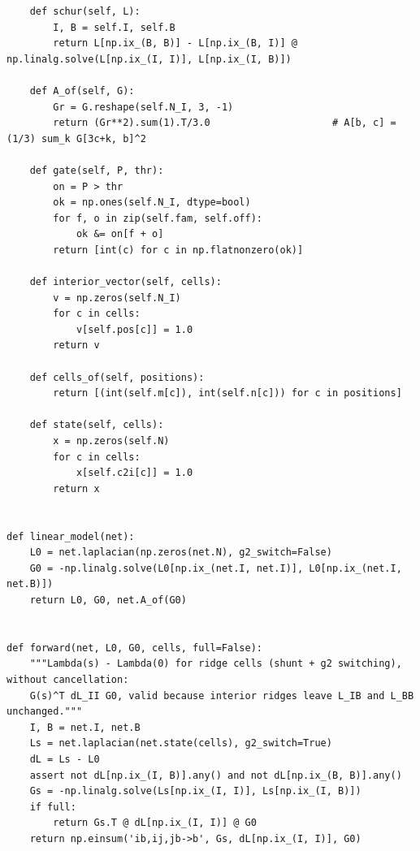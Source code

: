 \documentclass[11pt,a4paper]{article}
\theoremstyle{definition}
\theoremstyle{remark}
\begin{document}
\begin{lstlisting}
    def schur(self, L):
        I, B = self.I, self.B
        return L[np.ix_(B, B)] - L[np.ix_(B, I)] @ np.linalg.solve(L[np.ix_(I, I)], L[np.ix_(I, B)])

    def A_of(self, G):
        Gr = G.reshape(self.N_I, 3, -1)
        return (Gr**2).sum(1).T/3.0                     # A[b, c] = (1/3) sum_k G[3c+k, b]^2

    def gate(self, P, thr):
        on = P > thr
        ok = np.ones(self.N_I, dtype=bool)
        for f, o in zip(self.fam, self.off):
            ok &= on[f + o]
        return [int(c) for c in np.flatnonzero(ok)]

    def interior_vector(self, cells):
        v = np.zeros(self.N_I)
        for c in cells:
            v[self.pos[c]] = 1.0
        return v

    def cells_of(self, positions):
        return [(int(self.m[c]), int(self.n[c])) for c in positions]

    def state(self, cells):
        x = np.zeros(self.N)
        for c in cells:
            x[self.c2i[c]] = 1.0
        return x


def linear_model(net):
    L0 = net.laplacian(np.zeros(net.N), g2_switch=False)
    G0 = -np.linalg.solve(L0[np.ix_(net.I, net.I)], L0[np.ix_(net.I, net.B)])
    return L0, G0, net.A_of(G0)


def forward(net, L0, G0, cells, full=False):
    """Lambda(s) - Lambda(0) for ridge cells (shunt + g2 switching), without cancellation:
    G(s)^T dL_II G0, valid because interior ridges leave L_IB and L_BB unchanged."""
    I, B = net.I, net.B
    Ls = net.laplacian(net.state(cells), g2_switch=True)
    dL = Ls - L0
    assert not dL[np.ix_(I, B)].any() and not dL[np.ix_(B, B)].any()
    Gs = -np.linalg.solve(Ls[np.ix_(I, I)], Ls[np.ix_(I, B)])
    if full:
        return Gs.T @ dL[np.ix_(I, I)] @ G0
    return np.einsum('ib,ij,jb->b', Gs, dL[np.ix_(I, I)], G0)



\end{lstlisting}
\end{document}
